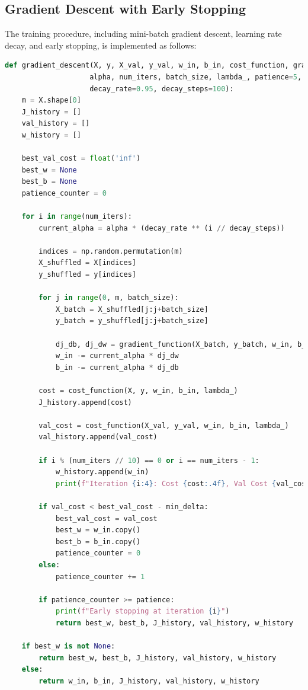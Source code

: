 \documentclass[10pt,journal,compsoc]{IEEEtran}
\begin{document}
\subsection{Gradient Descent with Early Stopping}
The training procedure, including mini-batch gradient descent, learning rate decay, and early stopping, is implemented as follows:

\begin{lstlisting}[language=Python]
def gradient_descent(X, y, X_val, y_val, w_in, b_in, cost_function, gradient_function, 
                    alpha, num_iters, batch_size, lambda_, patience=5, min_delta=0.001,
                    decay_rate=0.95, decay_steps=100):
    m = X.shape[0]
    J_history = []
    val_history = []
    w_history = []
    
    best_val_cost = float('inf')
    best_w = None
    best_b = None
    patience_counter = 0
    
    for i in range(num_iters):
        current_alpha = alpha * (decay_rate ** (i // decay_steps))
        
        indices = np.random.permutation(m)
        X_shuffled = X[indices]
        y_shuffled = y[indices]
        
        for j in range(0, m, batch_size):
            X_batch = X_shuffled[j:j+batch_size]
            y_batch = y_shuffled[j:j+batch_size]
            
            dj_db, dj_dw = gradient_function(X_batch, y_batch, w_in, b_in, lambda_)
            w_in -= current_alpha * dj_dw
            b_in -= current_alpha * dj_db
        
        cost = cost_function(X, y, w_in, b_in, lambda_)
        J_history.append(cost)
        
        val_cost = cost_function(X_val, y_val, w_in, b_in, lambda_)
        val_history.append(val_cost)
        
        if i % (num_iters // 10) == 0 or i == num_iters - 1:
            w_history.append(w_in)
            print(f"Iteration {i:4}: Cost {cost:.4f}, Val Cost {val_cost:.4f}, Alpha {current_alpha:.6f}")
        
        if val_cost < best_val_cost - min_delta:
            best_val_cost = val_cost
            best_w = w_in.copy()
            best_b = b_in.copy()
            patience_counter = 0
        else:
            patience_counter += 1
            
        if patience_counter >= patience:
            print(f"Early stopping at iteration {i}")
            return best_w, best_b, J_history, val_history, w_history
    
    if best_w is not None:
        return best_w, best_b, J_history, val_history, w_history
    else:
        return w_in, b_in, J_history, val_history, w_history
\end{lstlisting}
\end{document}
